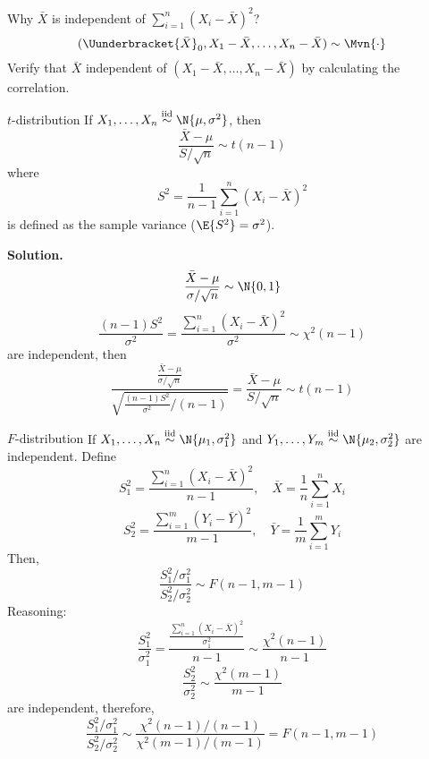 Why $ \bar{X} $ is independent of $ \sum_{i=1}^{n} (X_i-\bar{X})^2 $?
\[ (\Uunderbracket{\bar{X}}_{0},X_1-\bar{X},\ldots,X_n-\bar{X})\sim \Mvn{\cdot} \]
Verify that $ \bar{X} $ independent of $ (X_1-\bar{X},\ldots,X_n-\bar{X}) $
by calculating the correlation.
\begin{Example}{$ t $-distribution}{}
    If $ X_1,\ldots,X_n \stackrel{\text{iid}}{\sim}\N{\mu,\sigma^2} $,
    then
    \[ \frac{\bar{X}-\mu}{S/\sqrt{n}}\sim t(n-1)  \]
    where
    \[ S^2=\frac{1}{n-1} \sum_{i=1}^{n} (X_i-\bar{X})^2 \]
    is defined as the sample variance ($ \E{S^2}=\sigma^2 $).

    \textbf{Solution.}
    \[ \frac{\bar{X}-\mu}{\sigma/\sqrt{n}}\sim \N{0,1}  \]
    \[ \frac{(n-1)S^2}{\sigma^2}=\frac{\sum_{i=1}^{n} (X_i-\bar{X})^2}{\sigma^2}
        \sim \chi^2(n-1)   \]
    are independent, then
    \[ \frac{\displaystyle \frac{\bar{X}-\mu}{\sigma/\sqrt{n}}}{
            \displaystyle \sqrt{\frac{(n-1)S^2}{\sigma^2}\bigg/(n-1)}
        } =\frac{\bar{X}-\mu}{S/\sqrt{n}} \sim t(n-1) \]
\end{Example}
\begin{Example}{$ F $-distribution}{}
    If $ X_1,\ldots,X_n \stackrel{\text{iid}}{\sim}\N{\mu_1,\sigma_1^2} $
    and $ Y_1,\ldots,Y_m \stackrel{\text{iid}}{\sim}\N{\mu_2,\sigma_2^2} $
    are independent. Define
    \[ S_1^2=\frac{\sum_{i=1}^{n} (X_i-\bar{X})^2}{n-1},\quad
        \bar{X}=\frac{1}{n} \sum_{i=1}^{n} X_i \]
    \[ S_2^2=\frac{\sum_{i=1}^{m} (Y_i-\bar{Y})^2}{m-1},\quad
        \bar{Y}=\frac{1}{m} \sum_{i=1}^{m} Y_i \]
    Then,
    \[ \frac{S_1^2/\sigma_1^2}{S_2^2/\sigma_2^2} \sim F(n-1,m-1) \]
    Reasoning:
    \[ \frac{S_1^2}{\sigma_1^2}=\frac{\displaystyle \frac{\sum_{i=1}^{n} (X_i-\bar{X})^2}{\sigma_1^2}}{
            n-1
        }\sim \frac{\chi^2(n-1)}{n-1}   \]
    \[ \frac{S_2^2}{\sigma_2^2}\sim \frac{\chi^2(m-1)}{m-1}  \]
    are independent, therefore,
    \[ \frac{S_1^2/\sigma_1^2}{S_2^2/\sigma_2^2}\sim
        \frac{\chi^2(n-1)/(n-1)}{\chi^2(m-1)/(m-1)}=F(n-1,m-1)  \]
\end{Example}
